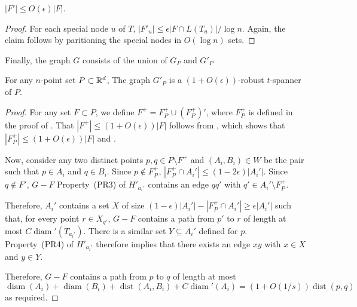 \documentclass{patmorin}
\DeclareMathOperator{\diam}{diam}
\DeclareMathOperator{\dist}{dist}
\begin{document}
\begin{clm}
  $|F'| \le O(\epsilon)|F|$.
\end{clm}

\begin{proof}
  For each special node $u$ of $T$, $|F'_u|\le \epsilon|F\cap L(T_u)|/\log
  n$.  Again, the claim follows by paritioning the special nodes in
  $O(\log n)$ sets.
\end{proof}

Finally, the graph $G$ consists of the union of $G_P$ and $G'_P$


\begin{clm}
  For any $n$-point set $P\subset\mathbb{R}^d$, The graph $G'_P$  is a
  $(1+O(\epsilon))$-robust $t$-spanner of $P$.
\end{clm}

\begin{proof}
  For any set $F\subset P$, we define $F^+ = F^+_P \cup (F^+_P)'$, where
  $F^+_P$ is defined in the proof of .  That $|F^+|
  \le (1+O(\epsilon))|F|$ follows from , which
  shows that $|F^+_P|\le (1+O(\epsilon))|F|$ and .

  Now, consider any two distinct points $p,q\in P\setminus F^+$ and
  $(A_i,B_i)\in W$ be the pair such that $p\in A_i$ and $q\in B_i$.
  Since $p\not\in F^+_P$, $|F^+_P\cap A_i'|\le (1-2\epsilon)|A_i'|$.
  Since $q\not\in F'$, $G-F$ Property~(PR3) of $H'_{a_i'}$ contains
  an edge $qq'$ with $q'\in A_i'\setminus F^+_P$.

  Therefore, $A_i'$ contains a set $X$ of size
  $(1-\epsilon)|A_i'|-|F^+_P\cap A_i'|\ge \epsilon|A_i'|$ such that, for
  every point $r\in X_{q'}$, $G-F$ contains a path from $p'$ to $r$ of
  length at most $C\diam'(T_{a_i'})$.  There is a similar set $Y\subseteq
  A_i'$ defined for $p$.  Property~(PR4) of $H'_{a_i'}$ therefore implies
  that there exists an edge $xy$ with $x\in X$ and $y\in Y$.

  Therefore, $G-F$ contains a path from $p$ to $q$ of length at most
  \[  \diam(A_i) + \diam(B_i) + \dist(A_i,B_i) + C\diam'(A_i) = (1+O(1/s))\dist(p,q)
  \]
  as required.
\end{proof}




\end{document}
